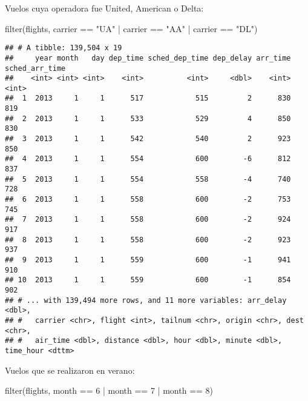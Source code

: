\documentclass[
]{article}
\newenvironment{Shaded}{\begin{snugshade}}{\end{snugshade}}
\newcommand{\DecValTok}[1]{\textcolor[rgb]{0.00,0.00,0.81}{#1}}
\newcommand{\FunctionTok}[1]{\textcolor[rgb]{0.00,0.00,0.00}{#1}}
\newcommand{\NormalTok}[1]{#1}
\newcommand{\SpecialCharTok}[1]{\textcolor[rgb]{0.00,0.00,0.00}{#1}}
\newcommand{\StringTok}[1]{\textcolor[rgb]{0.31,0.60,0.02}{#1}}
\begin{document}
Vuelos cuya operadora fue United, American o Delta:

\begin{Shaded}
\begin{Highlighting}[]
\FunctionTok{filter}\NormalTok{(flights, carrier }\SpecialCharTok{==} \StringTok{"UA"} \SpecialCharTok{|}\NormalTok{ carrier }\SpecialCharTok{==} \StringTok{"AA"} \SpecialCharTok{|}\NormalTok{ carrier }\SpecialCharTok{==} \StringTok{"DL"}\NormalTok{)}
\end{Highlighting}
\end{Shaded}

\begin{verbatim}
## # A tibble: 139,504 x 19
##     year month   day dep_time sched_dep_time dep_delay arr_time sched_arr_time
##    <int> <int> <int>    <int>          <int>     <dbl>    <int>          <int>
##  1  2013     1     1      517            515         2      830            819
##  2  2013     1     1      533            529         4      850            830
##  3  2013     1     1      542            540         2      923            850
##  4  2013     1     1      554            600        -6      812            837
##  5  2013     1     1      554            558        -4      740            728
##  6  2013     1     1      558            600        -2      753            745
##  7  2013     1     1      558            600        -2      924            917
##  8  2013     1     1      558            600        -2      923            937
##  9  2013     1     1      559            600        -1      941            910
## 10  2013     1     1      559            600        -1      854            902
## # ... with 139,494 more rows, and 11 more variables: arr_delay <dbl>,
## #   carrier <chr>, flight <int>, tailnum <chr>, origin <chr>, dest <chr>,
## #   air_time <dbl>, distance <dbl>, hour <dbl>, minute <dbl>, time_hour <dttm>
\end{verbatim}

Vuelos que se realizaron en verano:

\begin{Shaded}
\begin{Highlighting}[]
\FunctionTok{filter}\NormalTok{(flights, month }\SpecialCharTok{==} \DecValTok{6} \SpecialCharTok{|}\NormalTok{ month }\SpecialCharTok{==} \DecValTok{7} \SpecialCharTok{|}\NormalTok{ month }\SpecialCharTok{==} \DecValTok{8}\NormalTok{)}
\end{Highlighting}
\end{Shaded}
\end{document}
